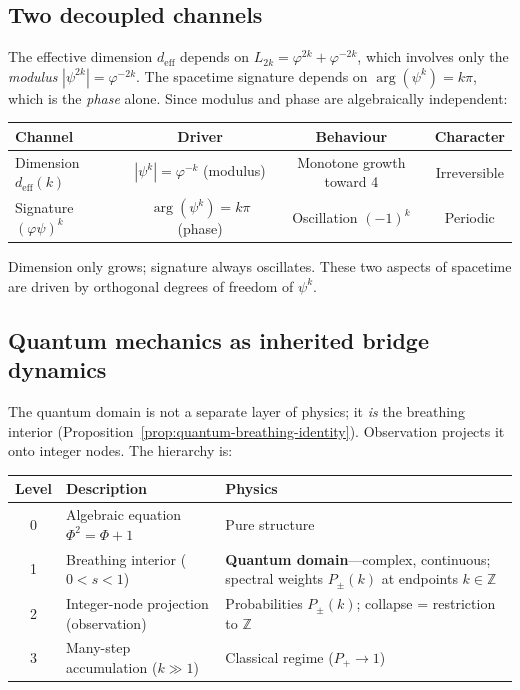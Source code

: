 \documentclass[12pt,a4paper]{article}
\begin{document}
\subsection{Two decoupled channels}

The effective dimension $d_{\mathrm{eff}}$ depends on $L_{2k} = \varphi^{2k} + \varphi^{-2k}$, which involves only the \emph{modulus} $|\psi^{2k}| = \varphi^{-2k}$. The spacetime signature depends on $\arg(\psi^k) = k\pi$, which is the \emph{phase} alone. Since modulus and phase are algebraically independent:

\begin{center}
\begin{tabular}{|l|c|c|c|}
\hline
\textbf{Channel} & \textbf{Driver} & \textbf{Behaviour} & \textbf{Character} \\
\hline
Dimension $d_{\mathrm{eff}}(k)$ & $|\psi^k| = \varphi^{-k}$ (modulus) & Monotone growth toward 4 & Irreversible \\
Signature $(\varphi\psi)^k$ & $\arg(\psi^k) = k\pi$ (phase) & Oscillation $(-1)^k$ & Periodic \\
\hline
\end{tabular}
\end{center}

\noindent Dimension only grows; signature always oscillates. These two aspects of spacetime are driven by orthogonal degrees of freedom of $\psi^k$.

\subsection{Quantum mechanics as inherited bridge dynamics}
\label{sec:qm-inheritance}

The quantum domain is not a separate layer of physics; it \emph{is} the breathing interior (Proposition~\ref{prop:quantum-breathing-identity}). Observation projects it onto integer nodes. The hierarchy is:

\begin{center}
\begin{tabular}{|c|l|l|}
\hline
\textbf{Level} & \textbf{Description} & \textbf{Physics} \\
\hline
0 & Algebraic equation $\Phi^2 = \Phi + 1$ & Pure structure \\
1 & Breathing interior ($0 < s < 1$) & \textbf{Quantum domain}---complex, continuous; spectral weights $P_\pm(k)$ at endpoints $k \in \mathbb{Z}$ \\
2 & Integer-node projection (observation) & Probabilities $P_\pm(k)$; collapse = restriction to $\mathbb{Z}$ \\
3 & Many-step accumulation ($k \gg 1$) & Classical regime ($P_+ \to 1$) \\
\hline
\end{tabular}
\end{center}
\end{document}
